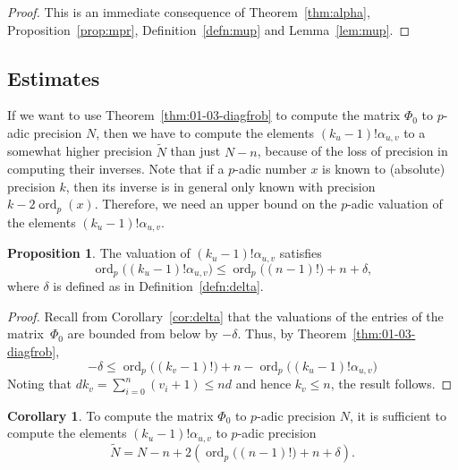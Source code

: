 \documentclass[a4paper,11pt]{article}
\numberwithin{equation}{section}
\DeclareMathOperator{\ord}{ord}          %
\theoremstyle{definition}
\newtheorem{prop}[thm]{Proposition}
\newtheorem{cor}[thm]{Corollary}
\begin{document}
\begin{proof}
This is an immediate consequence of Theorem~\ref{thm:alpha}, Proposition~\ref{prop:mpr},
Definition~\ref{defn:mup} and Lemma~\ref{lem:mup}.
\end{proof}

\subsection{Estimates}

If we want to use Theorem~\ref{thm:01-03-diagfrob} to compute the matrix 
$\Phi_0$ to $p$-adic precision $N$, then we have to compute the elements
$(k_u-1)!\alpha_{u,v}$ to a somewhat higher precision $\tilde{N}$ than just
$N-n$, because 
of the loss of precision in computing their inverses. Note that if a $p$-adic 
number $x$ is known to (absolute) precision $k$, then its inverse is in general 
only known with precision $k-2\ord_p(x)$. Therefore, we need an upper bound
on the $p$-adic valuation of the elements $(k_u-1)!\alpha_{u,v}$.

\begin{prop}
The valuation of $(k_u-1)! \alpha_{u,v}$ satisfies
\begin{equation*}
\ord_p\bigl((k_u-1)! \alpha_{u,v}\bigr) 
    \leq \ord_p\bigl((n-1)!\bigr) + n + \delta,
\end{equation*}
where $\delta$ is defined as in Definition~\ref{defn:delta}. 
\end{prop}

\begin{proof}
Recall from Corollary~\ref{cor:delta} that the valuations 
of the entries of the matrix~$\Phi_0$ are bounded from below by $-\delta$. 
Thus, by Theorem~\ref{thm:01-03-diagfrob}, 
\begin{equation*}
-\delta \leq \ord_p\bigl((k_v-1)!\bigr) + n 
           - \ord_p\bigl((k_u-1)! \alpha_{u,v}\bigr)
\end{equation*}
Noting that $d k_v = \sum_{i=0}^n (v_i + 1) \leq n d$ and 
hence $k_v \leq n$, the result follows.
\end{proof}

\begin{cor} \label{cor:Ntilde}
To compute the matrix $\Phi_0$ to $p$-adic precision $N$, it is sufficient to compute the elements 
$(k_u-1)!\alpha_{u,v}$ to $p$-adic precision
\begin{equation*}
\tilde{N}=N-n+2(\ord_p\bigl((n-1)!\bigr)+n+\delta).
\end{equation*}
\end{cor}
\end{document}
